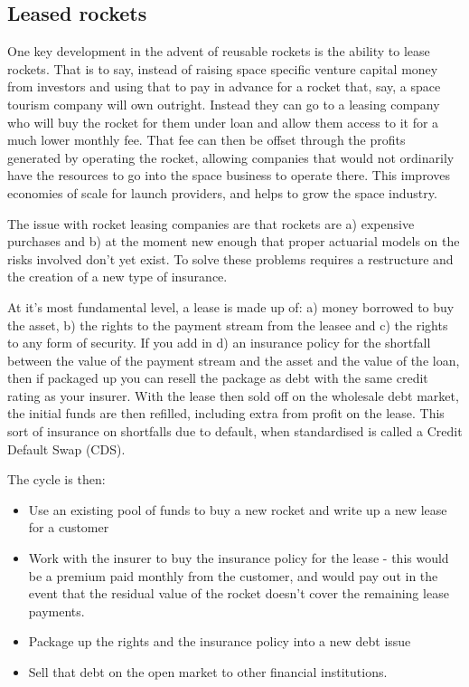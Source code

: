 \documentclass[10pt]{article}
\begin{document}
\subsection{Leased rockets}
One key development in the advent of reusable rockets is the ability to lease rockets. That is to say, instead of raising space specific venture capital money from investors and using that to pay in advance for a rocket that, say, a space tourism company will own outright. Instead they can go to a leasing company who will buy the rocket for them under loan and allow them access to it for a much lower monthly fee. That fee can then be offset through the profits generated by operating the rocket, allowing companies that would not ordinarily have the resources to go into the space business to operate there. This improves economies of scale for launch providers, and helps to grow the space industry.

The issue with rocket leasing companies are that rockets are a) expensive purchases and b) at the moment new enough that proper actuarial models on the risks involved don't yet exist. To solve these problems requires a restructure and the creation of a new type of insurance.

At it's most fundamental level, a lease is made up of: a) money borrowed to buy the asset, b) the rights to the payment stream from the leasee and c) the rights to any form of security. If you add in d) an insurance policy for the shortfall between the value of the payment stream and the asset and the value of the loan, then if packaged up you can resell the package as debt with the same credit rating as your insurer. With the lease then sold off on the wholesale debt market, the initial funds are then refilled, including extra from profit on the lease. This sort of insurance on shortfalls due to default, when standardised is called a Credit Default Swap (CDS).

The cycle is then:
\begin{itemize}
    \item Use an existing pool of funds to buy a new rocket and write up a new lease for a customer
    \item Work with the insurer to buy the insurance policy for the lease - this would be a premium paid monthly from the customer, and would pay out in the event that the residual value of the rocket doesn't cover the remaining lease payments.
    \item Package up the rights and the insurance policy into a new debt issue
    \item Sell that debt on the open market to other financial institutions.
\end{itemize}
\end{document}

